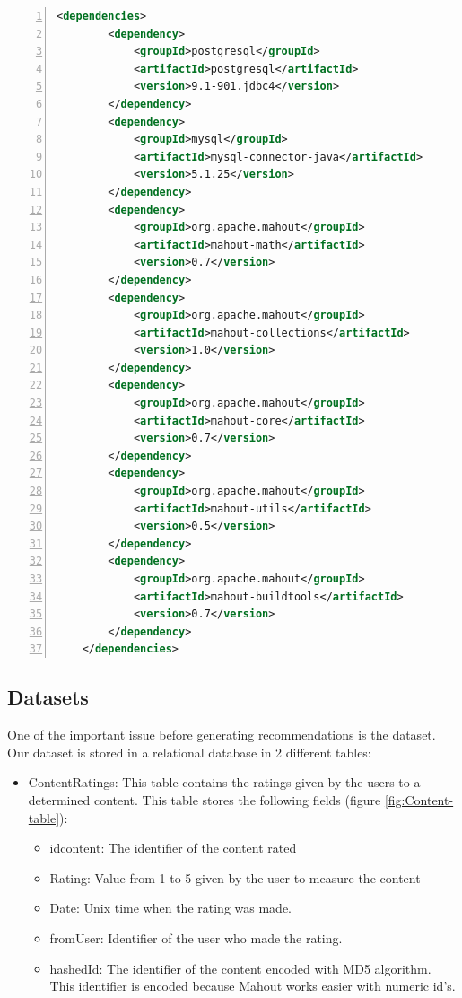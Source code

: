 \documentclass[a4paper,10pt]{article}
\begin{document}
\begin{lstlisting}[basicstyle={\scriptsize},breaklines=true,language=XML,
numbers=left,numberstyle={\scriptsize},tabsize=4]
  <dependencies>
        <dependency>
			<groupId>postgresql</groupId>
			<artifactId>postgresql</artifactId>
			<version>9.1-901.jdbc4</version>
		</dependency>
        <dependency>
            <groupId>mysql</groupId>
            <artifactId>mysql-connector-java</artifactId>
            <version>5.1.25</version>
        </dependency>
        <dependency>
            <groupId>org.apache.mahout</groupId>
            <artifactId>mahout-math</artifactId>
            <version>0.7</version>
        </dependency>
        <dependency>
            <groupId>org.apache.mahout</groupId>
            <artifactId>mahout-collections</artifactId>
            <version>1.0</version>
        </dependency>
        <dependency>
            <groupId>org.apache.mahout</groupId>
            <artifactId>mahout-core</artifactId>
            <version>0.7</version>
        </dependency>
        <dependency>
            <groupId>org.apache.mahout</groupId>
            <artifactId>mahout-utils</artifactId>
            <version>0.5</version>
        </dependency>
        <dependency>
            <groupId>org.apache.mahout</groupId>
            <artifactId>mahout-buildtools</artifactId>
            <version>0.7</version>
        </dependency>
    </dependencies>
\end{lstlisting}


\subsection{Datasets}

One of the important issue before generating recommendations is
the dataset. Our dataset is stored in a relational database in 2 different
tables:

\begin{itemize}
\item ContentRatings: This table contains the ratings given by the users
to a determined content. This table stores the following fields (figure
\ref{fig:Content-table}):

\begin{itemize}
\item idcontent: The identifier of the content rated
\item Rating: Value from 1 to 5 given by the user to measure the content
\item Date: Unix time when the rating was made.
\item fromUser: Identifier of the user who made the rating.
\item hashedId: The identifier of the content encoded with MD5 algorithm.
This identifier is encoded because Mahout works easier with numeric
id's.
\end{itemize}
\end{itemize}
\end{document}
